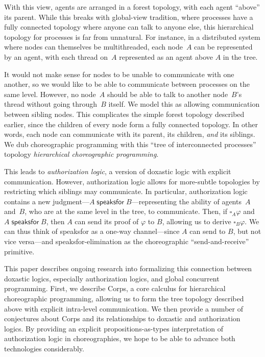 With this view, agents are arranged in a forest topology, with each agent ``above'' its parent.
While this breaks with global-view tradition, where processes have a fully connected topology where anyone can talk to anyone else, this hierarchical topology for processes is far from unnatural.
For instance, in a distributed system where nodes can themselves be multithreaded, each node~$A$ can be represented by an agent, with each thread on~$A$ represented as an agent above $A$ in the tree.

It would not make sense for nodes to be unable to communicate with one another, so we would like to be able to communicate between processes on the same level.
However, no node~$A$ should be able to talk to another node~$B$'s thread without going through~$B$ itself.
We model this as allowing communication between sibling nodes.
This complicates the simple forest topology described earlier, since the children of every node form a fully connected topology.
In other words, each node can communicate with its parent, its children, \emph{and} its siblings.
We dub choreographic programming with this ``tree of interconnected processes'' topology \emph{hierarchical choreographic programming}.

This leads to \emph{authorization logic}, a version of doxastic logic with explicit communication.
However, authorization logic allows for more-subtle topologies by restricting which siblings may communicate.
In particular, authorization logic contains a new judgment---$A \mathrel{\textsf{speaksfor}} B$---representing the ability of agents~$A$ and~$B$, who are at the same level in the tree, to communicate.
Then, if $\square_A \varphi$ and $A \mathrel{\textsf{speaksfor}} B$, then $A$ can send its proof of $\varphi$ to $B$, allowing us to derive $\square_B \varphi$.
We can thus think of \textsf{speaksfor} as a one-way channel---since $A$ can send to $B$, but not vice versa---and \textsf{speaksfor}-elimination as the choreographic ``send-and-receive'' primitive.

This paper describes ongoing research into formalizing this connection between doxastic logics, especially authorization logics, and global concurrent programming.
First, we describe Corps, a core calculus for hierarchical choreographic programming, allowing us to form the tree topology described above with explicit intra-level communication.
We then provide a number of conjectures about Corps and its relationships to doxastic and authorization logics.
By providing an explicit propositions-as-types interpretation of authorization logic in choreographies, we hope to be able to advance both technologies considerably.

